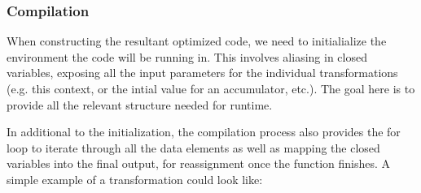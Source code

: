 \subsubsection{Compilation}
When constructing the resultant optimized code, we need to initialialize the environment the code will be running in.  This involves aliasing in closed variables, exposing all the input parameters for the individual transformations (e.g. this context, or the intial value for an accumulator, etc.).  The goal here is to provide all the relevant structure needed for runtime.  

In additional to the initialization, the compilation process also provides the for loop to iterate through all the data elements as well as mapping the closed variables into the final output, for reassignment once the function finishes.  A simple example of a transformation could look like:

\begin{minipage}{\linewidth}

\end{minipage}